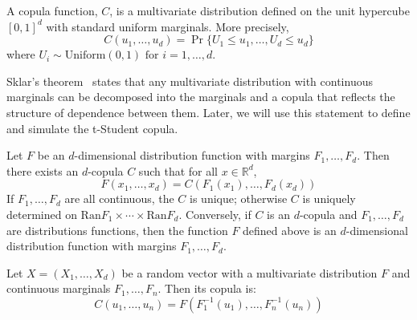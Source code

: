 \documentclass[11pt,fleqn]{book} %
\begin{document}
\begin{definition}[Copula]
	A copula function, $C$, is a multivariate distribution defined on the 
	unit hypercube $[0,1]^d$ with standard uniform marginals. 
	More precisely,
	\begin{displaymath}
		C(u_1, \dots, u_d) = \Pr\{U_1 \le u_1, \dots, U_d \le u_d\}
	\end{displaymath}
	where $U_i \sim \text{Uniform}(0,1) \text{ for } i = 1,\dots, d$.
\end{definition}

Sklar's theorem~\cite{sklar:1959} states that any multivariate 
distribution with continuous marginals can be decomposed into the marginals and 
a copula that reflects the structure of dependence between them. Later, we will 
use this statement to define and simulate the t-Student copula.

\begin{theorem}
	\label{thm:sklar}
	Let $F$ be an $d$-dimensional distribution function with margins $F_1,\dots,F_d$.
	Then there exists an $d$-copula $C$ such that for all $x \in \mathbb{R}^d$,
	\begin{displaymath}
		F(x_1,\dots,x_d) = C(F_1(x_1),\dots,F_d(x_d))
	\end{displaymath}
	If $F_1,\dots,F_d$ are all continuous, the $C$ is unique; otherwise $C$ is uniquely
	determined on $\text{Ran}F_1 \times \cdots \times \text{Ran}F_d$.
	Conversely, if $C$ is an $d$-copula and $F_1,\dots,F_d$ are distributions functions,
	then the function $F$ defined above is an $d$-dimensional distribution function
	with margins $F_1,\dots,F_d$.
\end{theorem}

\begin{corollary}
	\label{cor:cop1}
	Let $X=(X_1, \dots, X_d)$ be a random vector with a multivariate 
	distribution $F$ and continuous marginals $F_1, \dots, F_n$. 
	Then its copula is:
	\begin{displaymath}
		C(u_1,\dots,u_n) = F(F_1^{-1}(u_1), \dots, F_n^{-1}(u_n))
	\end{displaymath}
\end{corollary}
\end{document}
